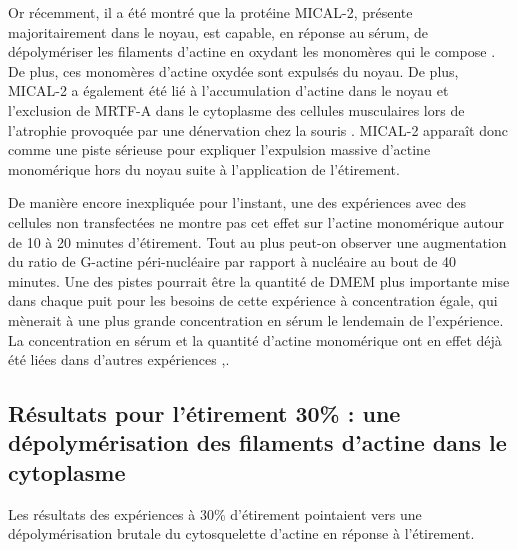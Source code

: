 Or récemment, il a été montré que la protéine MICAL-2, présente majoritairement dans le noyau, est capable, en réponse au sérum, de dépolymériser les filaments d'actine en oxydant les monomères qui le compose \cite{lundquist}. De plus, ces monomères d'actine oxydée sont expulsés du noyau. De plus, MICAL-2 a également été lié à l'accumulation d'actine dans le noyau et l'exclusion de MRTF-A dans le cytoplasme des cellules musculaires lors de l'atrophie provoquée par une dénervation chez la souris \cite{collard}. MICAL-2 apparaît donc comme une piste sérieuse pour expliquer l'expulsion massive d'actine monomérique hors du noyau suite à l'application de l'étirement. 

De manière encore inexpliquée pour l'instant, une des expériences avec des cellules non transfectées ne montre pas cet effet sur l'actine monomérique autour de 10 à 20 minutes d'étirement. Tout au plus peut-on observer une augmentation du ratio de G-actine péri-nucléaire par rapport à nucléaire au bout de 40 minutes. Une des pistes pourrait être la quantité de DMEM plus importante mise dans chaque puit pour les besoins de cette expérience à concentration égale, qui mènerait à une plus grande concentration en sérum le lendemain de l'expérience. La concentration en sérum et la quantité d'actine monomérique ont en effet déjà été liées dans d'autres expériences \cite{Mouilleron},\cite{Vartiainen}\cite{lundquist}.  



\subsection{Résultats pour l'étirement 30\% : une dépolymérisation des filaments d'actine dans le cytoplasme}

Les résultats des expériences à 30\% d'étirement pointaient vers une dépolymérisation brutale du cytosquelette d'actine en réponse à l'étirement. 

